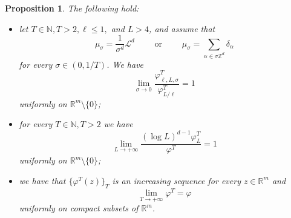 \documentclass{article}
\theoremstyle{plain}
\newtheorem{proposition}[theorem]{Proposition}
\theoremstyle{definition}
\def\rr{{\mathbb R}}
\def\NN{{\mathbb N}}
\def\ZZ{{\mathbb Z}}
\def\ms{\mu_\sigma}
\newcommand{\f}{\varphi}
\newcommand{\s}{\sigma}
\numberwithin{equation}{section}
\begin{document}
\begin{proposition}\label{proposition: psi limite} The following hold:
\begin{itemize}
  \item[(i)] let $T\in \NN, T>2, \ell\leq1,$ and $L>4$, and assume that 
  \begin{equation*}
  \ms=\frac{1}{\s^d}\mathcal{L}^d \qquad \text{ or } \qquad \ms=\sum_{\alpha\in \s\ZZ^d}\delta_\alpha    
  \end{equation*}
   for every $\s\in(0,1/T)$. We have
\begin{equation*}
    \lim_{\s\to0}\frac{\f^T_{\ell,L,\s}}{\f^T_{L/\ell}}=1
\end{equation*}
uniformly on $\rr^m\setminus\{0\}$;
\item[(ii)] for every $T\in\NN,T>2$ we have
\begin{equation*}
   \lim_{L\to+\infty} \frac{(\log L)^{d-1}\f^T_{L}}{\f^T}=1
\end{equation*}
uniformly on $\rr^m\setminus\{0\}$;
\item[(iii)] we have that $\{\f^T(z)\}_T$ is an increasing sequence for every $z\in \rr^m$ and
\begin{equation*}
   \lim_{T\to+\infty}\f^T= \f
\end{equation*}
uniformly on compact subsets of $\rr^m$.
\end{itemize}
\end{proposition}
\end{document}
